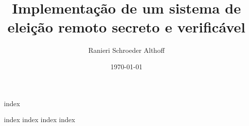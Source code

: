 \documentclass[
    a5paper, %
    openright, %
    twoside, %
    english, %
    brazil, %
    chapter=TITLE,
    section=TITLE,
]{abntex2}
\title{Implementação de um sistema de eleição remoto secreto e verificável}
\author{Ranieri Schroeder Althoff}
\date{\today}
\begin{document}
\sffamily

\pretextual

{index}

\textual

{index}
{index}
{index}
{index}

\printbibliography
\end{document}
